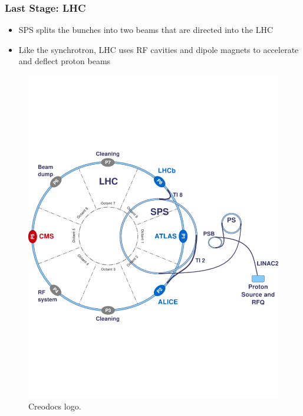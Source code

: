 \documentclass[
	11pt, %
]{beamer}
\begin{document}
\begin{frame}
\frametitle{Last Stage: LHC}
\begin{itemize}
	\item SPS splits the bunches into two beams that are directed into the LHC
	\item Like the synchrotron, LHC uses RF cavities and dipole magnets to accelerate and deflect proton beams

\end{itemize}
\begin{figure}
	\vspace*{-2cm}
	 \hspace*{0cm}
	\includegraphics[scale=.3]{cern_map.pdf}
	\caption{Creodocs logo.}
\end{figure}
\end{frame}
\end{document}
